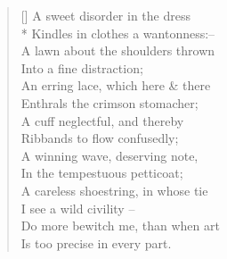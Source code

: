 \documentclass[MAIN]{subfiles}
\begin{document}
\settowidth{\versewidth}{A sweet disorder in the dress}
\begin{verse}[\versewidth]
A sweet disorder in the dress\\*
Kindles in clothes a wantonness:--\\
A lawn about the shoulders thrown\\
Into a fine distraction;\\
An erring lace, which here \& there\\
Enthrals the crimson stomacher;\\
A cuff neglectful, and thereby\\
Ribbands to flow confusedly;\\
A winning wave, deserving note,\\
In the tempestuous petticoat;\\
A careless shoestring, in whose tie\\
I see a wild civility --\\
Do more bewitch me, than when art\\
Is too precise in every part.
\end{verse}
\end{document}
